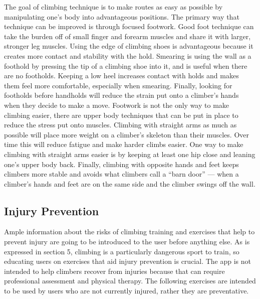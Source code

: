 \documentclass[10pt,twocolumn]{article}
\begin{document}
	The goal of climbing technique is to make routes as easy as possible by manipulating one’s body into advantageous positions. The primary way that technique can be improved is through focused footwork. Good foot technique can take the burden off of small finger and forearm muscles and share it with larger, stronger leg muscles. Using the edge of climbing shoes is advantageous because it creates more contact and stability with the hold. Smearing is using the wall as a foothold by pressing the tip of a climbing shoe into it, and is useful when there are no footholds. Keeping a low heel increases contact with holds and makes them feel more comfortable, especially when smearing. Finally, looking for footholds before handholds will reduce the strain put onto a climber's hands when they decide to make a move. 
	Footwork is not the only way to make climbing easier, there are upper body techniques that can be put in place to reduce the stress put onto muscles. Climbing with straight arms as much as possible will place more weight on a climber’s skeleton than their muscles. Over time this will reduce fatigue and make harder climbs easier. One way to make climbing with straight arms easier is by keeping at least one hip close and leaning one’s upper body back. Finally, climbing with opposite hands and feet keeps climbers more stable and avoids what climbers call a “barn door” — when a climber’s hands and feet are on the same side and the climber swings off the wall. \cite{rei_climbing_nodate}


\subsection{Injury Prevention}
    
    Ample information about the risks of climbing training and exercises that help to prevent injury are going to be introduced to the user before anything else. As is expressed in section 5, climbing is a particularly dangerous sport to train, so educating users on exercises that aid injury prevention is crucial. The app is not intended to help climbers recover from injuries because that can require professional assessment and physical therapy. The following exercises are intended to be used by users who are not currently injured, rather they are preventative. 
\end{document}
